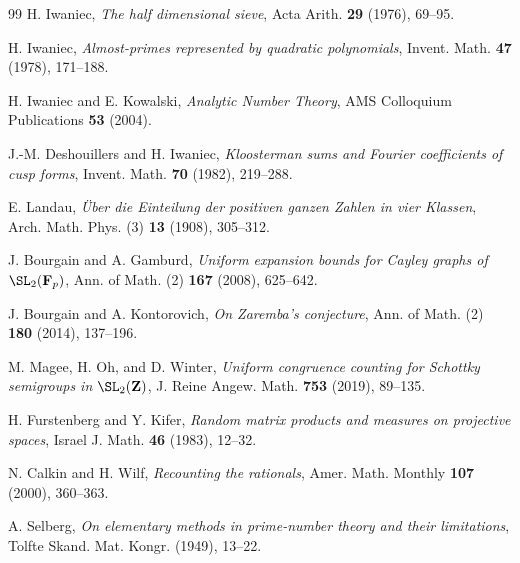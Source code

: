 ﻿\documentclass[11pt]{article}
\theoremstyle{definition}
\newcommand{\Z}{\mathbf{Z}}
\newcommand{\F}{\mathbf{F}}
\begin{document}
\begin{thebibliography}{99}
H. Iwaniec, \emph{The half dimensional sieve}, Acta Arith. \textbf{29} (1976), 69--95.

H. Iwaniec, \emph{Almost-primes represented by quadratic polynomials}, Invent. Math. \textbf{47} (1978), 171--188.

H. Iwaniec and E. Kowalski, \emph{Analytic Number Theory}, AMS Colloquium Publications \textbf{53} (2004).

J.-M. Deshouillers and H. Iwaniec, \emph{Kloosterman sums and Fourier coefficients of cusp forms}, Invent. Math. \textbf{70} (1982), 219--288.

E. Landau, \emph{\"Uber die Einteilung der positiven ganzen Zahlen in vier Klassen}, Arch. Math. Phys. (3) \textbf{13} (1908), 305--312.

J. Bourgain and A. Gamburd, \emph{Uniform expansion bounds for Cayley graphs of $\SL_2(\F_p)$}, Ann. of Math. (2) \textbf{167} (2008), 625--642.

J. Bourgain and A. Kontorovich, \emph{On Zaremba's conjecture}, Ann. of Math. (2) \textbf{180} (2014), 137--196.

M. Magee, H. Oh, and D. Winter, \emph{Uniform congruence counting for Schottky semigroups in $\SL_2(\Z)$}, J. Reine Angew. Math. \textbf{753} (2019), 89--135.

H. Furstenberg and Y. Kifer, \emph{Random matrix products and measures on projective spaces}, Israel J. Math. \textbf{46} (1983), 12--32.

N. Calkin and H. Wilf, \emph{Recounting the rationals}, Amer. Math. Monthly \textbf{107} (2000), 360--363.

A. Selberg, \emph{On elementary methods in prime-number theory and their limitations}, Tolfte Skand. Mat. Kongr. (1949), 13--22.

\end{thebibliography}
\end{document}
